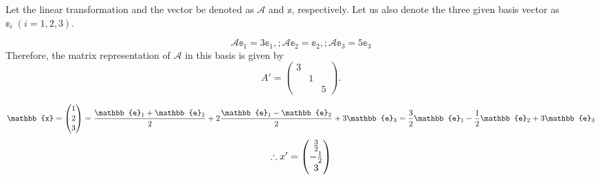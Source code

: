 \item

Let the linear transformation and the vector be denoted as
$\mathcal{A}$ and $\mathbb{x}$, respectively.
Let us also denote the three given basis vector as
$\mathbb{e}_i\; (i= 1, 2, 3)$.

\[
    \mathcal{A} \mathbb{e}_1 = 3\mathbb{e}_1,;
    \mathcal{A} \mathbb{e}_2 =  \mathbb{e}_2,;
    \mathcal{A} \mathbb{e}_3 = 5\mathbb{e}_3
\]
Therefore, the matrix representation of $\mathcal{A}$ in this basis is given by
\[
    A' = \begin{pmatrix}
        3 &   &   \\
          & 1 &   \\
          &   & 5
    \end{pmatrix}.
\]

\[
    \mathbb{x} = \begin{pmatrix}
        1 \\ 2 \\ 3
    \end{pmatrix}
    = \frac{\mathbb{e}_1 + \mathbb{e}_2}{2}
    + 2 \frac{\mathbb{e}_1 - \mathbb{e}_2}{2}
    + 3 \mathbb{e}_3 \\
    = \frac{3}{2} \mathbb{e}_1 - \half \mathbb{e}_2 + 3 \mathbb{e}_3
\]
\[
    \therefore x' = \begin{pmatrix}
        \frac{3}{2} \\ -\frac{1}{2} \\ 3
    \end{pmatrix}
\]